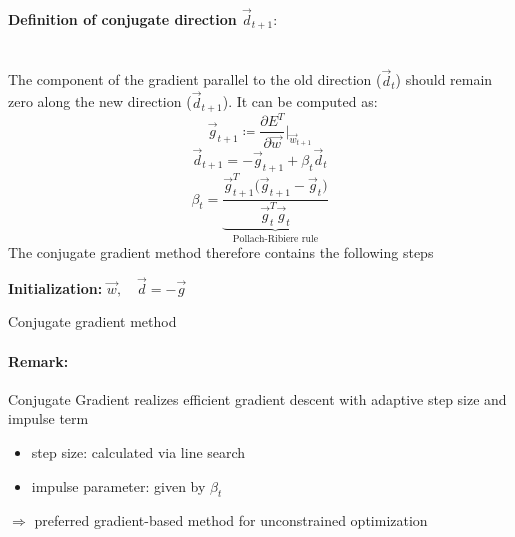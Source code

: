 \paragraph{Definition of conjugate direction $\vec{d}_{t+1}:$}\mbox{}\\
The component of the gradient parallel to the old direction ($\vec{d}_t$) 
should remain zero along the new direction 
($\vec{d}_{t+1}$).  It can be computed as:
\begin{equation} \tag{gradient}
	\vec{g}_{t+1} \coloneqq \frac{\partial E^T}{\partial \vec{w}}
		\bigg|_{\vec{w}_{t+1}}
\end{equation}
\begin{equation} 
	\vec{d}_{t+1} = -\vec{g}_{t+1} + \beta_t \vec{d}_t
\end{equation}
\begin{equation}
	\beta_t = \underbrace{ \frac{\vec{g}_{t+1}^T 
		\big( \vec{g}_{t+1} - \vec{g}_t \big)}{
		\vec{g}_t^T \vec{g}_t} }_{
			\text{Pollach-Ribiere rule}}
\end{equation}
The conjugate gradient method therefore contains the following steps
\begin{algorithm}
  \DontPrintSemicolon
  \textbf{Initialization:} $\vec{w},\quad \vec{d} = - \vec{g}$ \;
  \caption{Conjugate gradient method}
\end{algorithm}


\paragraph{Remark:} Conjugate Gradient realizes efficient gradient
descent with adaptive step size and impulse term
\begin{itemize}
\item step size: calculated via line search
\item impulse parameter: given by $\beta_t$
\end{itemize}
$\Rightarrow$ preferred gradient-based method for unconstrained optimization

